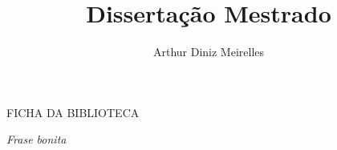 \documentclass[openany,a4paper,12pt,oneside]{book}
\title{Dissertação Mestrado}
\author{Arthur Diniz Meirelles}
\date{}
\begin{document}



\newpage

\begin{center}
\thispagestyle{empty}
\vspace*{\fill}
FICHA DA BIBLIOTECA
\vspace*{\fill}
\end{center}

\newpage




\begin{center}
\thispagestyle{empty}
\vspace*{\fill}
\textit{Frase bonita}
\vspace*{\fill}
\end{center}


\end{document}
